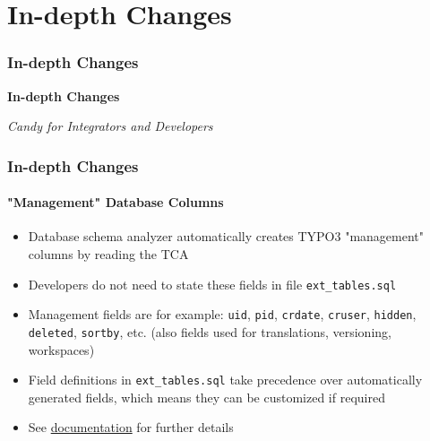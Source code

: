 %

\section{In-depth Changes}
\begin{frame}[fragile]
	\frametitle{In-depth Changes}

	\begin{center}\huge{\color{typo3darkgrey}\textbf{In-depth Changes}}\end{center}
	\begin{center}\large{\textit{Candy for Integrators and Developers}}\end{center}

\end{frame}



\begin{frame}[fragile]
	\frametitle{In-depth Changes}
	\framesubtitle{"Management" Database Columns}

	\begin{itemize}
		\item Database schema analyzer automatically creates TYPO3 "management"
			columns by reading the TCA
		\item Developers do not need to state these fields in file
			\texttt{ext\_tables.sql}
		\item Management fields are for example:\newline
			\texttt{uid}, \texttt{pid}, \texttt{crdate}, \texttt{cruser},
			\texttt{hidden}, \texttt{deleted}, \texttt{sortby}, etc.\newline
			\small(also fields used for translations, versioning, workspaces)\normalsize
		\item Field definitions in \texttt{ext\_tables.sql} take precedence
			over automatically generated fields, which means they can be
			customized if required
		\item See \href{https://docs.typo3.org/typo3cms/extensions/core/latest/Changelog/9.3/Feature-85160-AutoCreateManagementDBFieldsFromTCACtrl.html}{documentation}
			for further details
	\end{itemize}

\end{frame}

